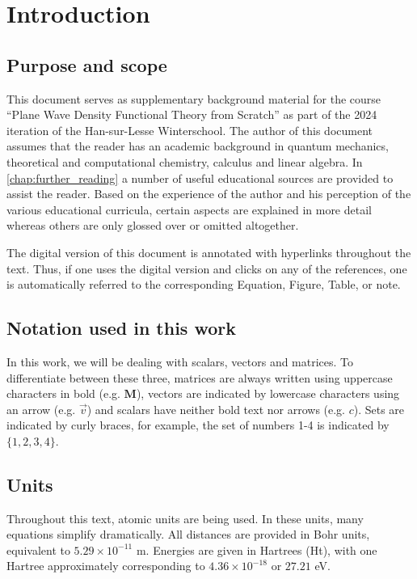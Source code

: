 %
%
%
\section{Introduction}

%
%
%
\subsection{Purpose and scope}

This document serves as supplementary background material for the  course ``Plane Wave Density Functional Theory from Scratch'' as part of the 2024 iteration of the Han-sur-Lesse Winterschool. The author of this document assumes that the reader has an academic background in quantum mechanics, theoretical and computational chemistry, calculus and linear algebra. In \cref{chap:further_reading} a number of useful educational sources are provided to assist the reader. Based on the experience of the author and his perception of the various educational curricula, certain aspects are explained in more detail whereas others are only glossed over or omitted altogether.

The digital version of this document is annotated with hyperlinks throughout the text. Thus, if one uses the digital version and clicks on any of the references, one is automatically referred to the corresponding Equation, Figure, Table, or note.

%
%
%
\subsection{Notation used in this work}

In this work, we will be dealing with scalars, vectors and matrices. To differentiate between these three, matrices are always written using uppercase characters in bold (e.g. $\mathbf{M}$), vectors are indicated by lowercase characters using an arrow (e.g. $\vec{v}$) and scalars have neither bold text nor arrows (e.g. $c$). Sets are indicated by curly braces, for example, the set of numbers 1-4 is indicated by $\{ 1,2,3,4 \}$.

%
%
%
\subsection{Units}
Throughout this text, atomic units are being used.\cite{szabo} In these units, many equations simplify dramatically. All distances are provided in Bohr units, equivalent to $5.29 \times 10^{-11}$ m. Energies are given in Hartrees (Ht), with one Hartree approximately corresponding to $4.36 \times 10^{-18}$ or $27.21$ eV.

